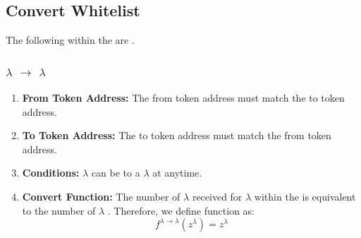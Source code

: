 \documentclass[class=article, crop=false]{standalone}
\begin{document}
\subsection{Convert Whitelist} 

The following  within the  are .
\subsubsection{$\lambda$ $\rightarrow$ $\lambda$}
    \begin{enumerate}
        \item \textbf{From Token Address:} The from token address must match the to token address.
        \item \textbf{To Token Address:} The to token address must match the from token address.
        \item \textbf{Conditions:}  $\lambda$ can be  to a $\lambda$  at anytime. 
        \item \textbf{Convert Function:} The number of $\lambda$ received for   $\lambda$ within the  is equivalent to the number of $\lambda$ . Therefore, we define  function as:
$$f^{\lambda \rightarrow \lambda}(z^{\lambda}) = z^{\lambda}$$

    \end{enumerate}
\end{document}
